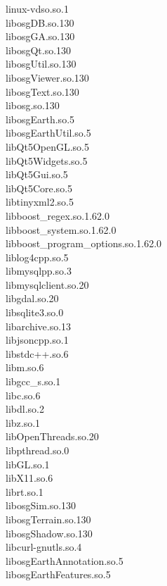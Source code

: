 \begin{multicols}{2}
linux-vdso.so.1 \\
libosgDB.so.130 \\
libosgGA.so.130 \\
libosgQt.so.130 \\
libosgUtil.so.130 \\
libosgViewer.so.130 \\
libosgText.so.130 \\
libosg.so.130 \\
libosgEarth.so.5 \\
libosgEarthUtil.so.5 \\
libQt5OpenGL.so.5 \\
libQt5Widgets.so.5 \\
libQt5Gui.so.5 \\
libQt5Core.so.5 \\
libtinyxml2.so.5 \\
libboost\_regex.so.1.62.0 \\
libboost\_system.so.1.62.0 \\
libboost\_program\_options.so.1.62.0 \\
liblog4cpp.so.5 \\
libmysqlpp.so.3 \\
libmysqlclient.so.20 \\
libgdal.so.20 \\
libsqlite3.so.0 \\
libarchive.so.13 \\
libjsoncpp.so.1 \\
libstdc++.so.6 \\
libm.so.6 \\
libgcc\_s.so.1 \\
libc.so.6 \\
libdl.so.2 \\
libz.so.1 \\
libOpenThreads.so.20 \\
libpthread.so.0 \\
libGL.so.1 \\
libX11.so.6 \\
librt.so.1 \\
libosgSim.so.130 \\
libosgTerrain.so.130 \\
libosgShadow.so.130 \\
libcurl-gnutls.so.4 \\
libosgEarthAnnotation.so.5 \\
libosgEarthFeatures.so.5 \\

\end{multicols}
